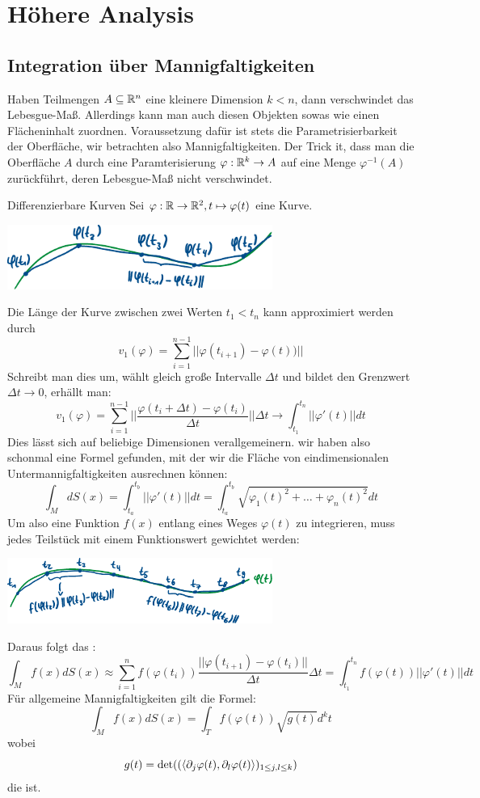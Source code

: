 \newpage
\section[Höhere Analysis]{Höhere Analysis}
\subsection{Integration über Mannigfaltigkeiten}
Haben Teilmengen $A\subseteq \mathbb{R}^n$ eine kleinere Dimension $k<n$, dann verschwindet das Lebesgue-Maß. Allerdings kann man auch diesen Objekten sowas wie einen Flächeninhalt zuordnen. Voraussetzung dafür ist stets die Parametrisierbarkeit der Oberfläche, wir betrachten also Mannigfaltigkeiten. Der Trick it, dass man die Oberfläche $A$ durch eine Paramterisierung $\varphi: \mathbb{R}^k\rightarrow A$ auf eine Menge $\varphi^{-1}(A)$ zurückführt, deren Lebesgue-Maß nicht verschwindet.
\begin{Def}{Differenzierbare Kurven}
    Sei $\varphi: \mathbb{R} \rightarrow \mathbb{R}^2, t\mapsto \varphi(t)$ eine Kurve.
    \begin{center}
    \includegraphics[width=0.65\textwidth]{Dateien/Linienintegral_1.pdf}
\end{center}
    Die Länge der Kurve zwischen zwei Werten $t_1<t_n$ kann approximiert werden durch
    $$v_1(\varphi)=\sum_{i=1}^{n-1}||\varphi(t_{i+1})-\varphi(t))||$$
    Schreibt man dies um, wählt gleich große Intervalle $\Delta t$ und bildet den Grenzwert $\Delta t \rightarrow 0$, erhällt man:
    $$v_1(\varphi)=\sum_{i=1}^{n-1}||\frac{\varphi(t_i+\Delta t)-\varphi(t_i)}{\Delta t}||\Delta t \rightarrow \int_{t_1}^{t_n}||\varphi'(t)||dt$$
    Dies lässt sich auf beliebige Dimensionen verallgemeinern. wir haben also schonmal eine Formel gefunden, mit der wir die Fläche von eindimensionalen Untermannigfaltigkeiten ausrechnen können:
    $$\int_M dS(x)=\int_{t_a}^{t_b}||\varphi'(t)||dt=\int_{t_a}^{t_b}\sqrt{\varphi_1(t)^2+\dots+\varphi_n(t)^2}dt$$
    Um also eine Funktion $f(x)$ entlang eines Weges $\varphi(t)$ zu integrieren, muss jedes Teilstück mit einem Funktionswert gewichtet werden:
    \begin{center}
    \includegraphics[width=0.65\textwidth]{Dateien/Linienintegral_2.pdf}
\end{center}
    Daraus folgt das :
    $$\int_M f(x) dS(x) \approx \sum_{i=1}^n f(\varphi(t_i))\frac{||\varphi(t_{i+1})-\varphi(t_i)||}{\Delta t}\Delta t= \int_{t_1}^{t_n}f(\varphi(t))||\varphi'(t)||dt$$
    Für allgemeine Mannigfaltigkeiten gilt die Formel:
    $$\int_M f(x)dS(x) = \int_T f(\varphi(t)) \sqrt{g(t)}d^kt$$
    wobei $$g(t)=\det((\braket{\partial_j \varphi(t), \partial_l \varphi(t)})_{1\leq j, l\leq k})$$ die  ist.
\end{Def}

